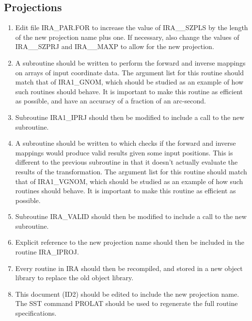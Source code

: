 \subsection {Projections}
\begin {enumerate}

\item Edit file IRA\_PAR.FOR to increase the value of IRA\_\_SZPLS by the
length of the new projection name plus one. If necessary, also change the values
of IRA\_\_SZPRJ and IRA\_\_MAXP to allow for the new projection.

\item A subroutine should be written to perform the forward and inverse mappings
on arrays of input coordinate data. The argument list for this routine should
match that of IRA1\_GNOM, which should be studied as an example of how such
routines should behave. It is important to make this routine as efficient as
possible, and have an accuracy of a fraction of an arc-second.

\item Subroutine IRA1\_IPRJ should then be modified to include a
call to the new subroutine.

\item A subroutine should be written to which checks if the forward and inverse
mappings would produce valid results given some input positions. This is
different to the previous subroutine in that it doesn't actually evaluate the
results of the transformation. The argument list for this routine should
match that of IRA1\_VGNOM, which should be studied as an example of how such
routines should behave. It is important to make this routine as efficient as
possible.

\item Subroutine IRA\_VALID should then be modified to include a
call to the new subroutine.

\item Explicit reference to the new projection name should then be included in
the routine IRA\_IPROJ.

\item Every routine in IRA should then be recompiled, and stored in a new object
library to replace the old object library.

\item This document (ID2) should be edited to include the new projection name.
The SST command PROLAT should be used to regenerate the full routine
specifications.

\end {enumerate}

